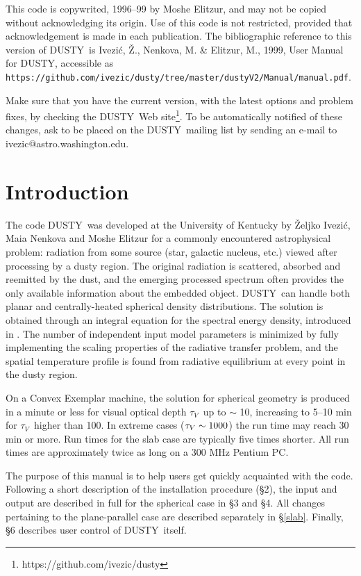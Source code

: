 \documentclass[12pt]{article} \usepackage{epsf}
\def\Section#1{\section{\sc #1}}
\def\D  {{\sf DUSTY}}
\def\tV     {\hbox{$\tau_V$}}
\def\Ivezic {Ivezi\'c}
\def\tthdump#1{#1}      %
\begin{document}
This code is copywrited, 1996--99 by Moshe Elitzur, and may not be copied
without acknowledging its origin. Use of this code is not restricted, provided
that acknowledgement is made in each publication.  The bibliographic reference
to this version of \D\ is \Ivezic, \v Z., Nenkova, M. \& Elitzur, M., 1999,
User Manual for \D, accessible as 
{\tt https://github.com/ivezic/dusty/tree/master/dustyV2/Manual/manual.pdf}. 

\tthdump{\bigskip}

Make sure that you have the current version, with the latest options and
problem fixes, by checking the \D\ Web site\footnote{https://github.com/ivezic/dusty}. 
To be automatically notified of these changes, ask to be placed on the \D\ mailing list by 
sending an e-mail to ivezic@astro.washington.edu.

\newpage

\tableofcontents \vskip 0.5in

\Section{Introduction} \label{Introduction}

The code \D\ was developed at the University of Kentucky by \v Zeljko \Ivezic,
Maia Nenkova and Moshe Elitzur for a commonly encountered astrophysical
problem: radiation from some source (star, galactic nucleus, etc.) viewed after
processing by a dusty region. The original radiation is scattered, absorbed and
reemitted by the dust, and the emerging processed spectrum often provides the
only available information about the embedded object. \D\ can handle both
planar and centrally-heated spherical density distributions.  The solution is
obtained through an integral equation for the spectral energy density,
introduced in \cite{IE97}. The number of independent input model parameters is
minimized by fully implementing the scaling properties of the radiative
transfer problem, and the spatial temperature profile is found from radiative
equilibrium at every point in the dusty region.

On a Convex Exemplar machine, the solution for spherical geometry is produced
in a minute or less for visual optical depth \tV\ up to $\sim$ 10, increasing
to 5--10 min for \tV\ higher than 100. In extreme cases ($\tV \sim 1000$) the
run time may reach 30 min or more. Run times for the slab case are typically
five times shorter. All run times are approximately twice as long on a 300 MHz
Pentium PC.

The purpose of this manual is to help users get quickly acquainted with the
code. Following a short description of the installation procedure (\S2), the
input and output are described in full for the spherical case in \S3 and \S4.
All changes pertaining to the plane-parallel case are described separately in
\S\ref{slab}.  Finally, \S6 describes user control of \D\ itself.
\end{document}
